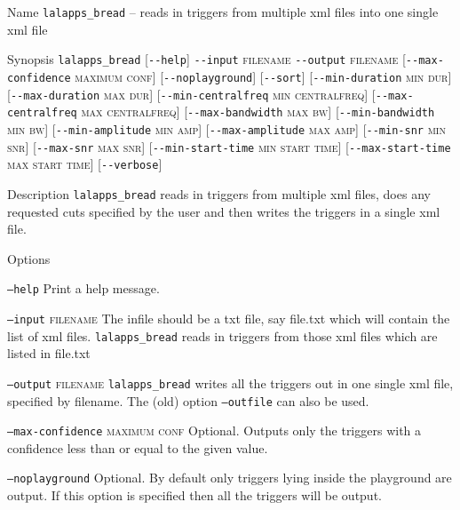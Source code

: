 \begin{entry}
\item[Name]
\verb$lalapps_bread$ -- reads in triggers from multiple xml files into one single xml file 

\item[Synopsis]
\verb$lalapps_bread$ 
[\verb$--help$]
\verb$--input$ \textsc{filename} 
\verb$--output$ \textsc{filename} 
[\verb$--max-confidence$ \textsc{maximum conf}]
[\verb$--noplayground$]
[\verb$--sort$]
[\verb$--min-duration$ \textsc{min dur}]
[\verb$--max-duration$ \textsc{max dur}]
[\verb$--min-centralfreq$ \textsc{min centralfreq}]
[\verb$--max-centralfreq$ \textsc{max centralfreq}]
[\verb$--max-bandwidth$ \textsc{max bw}]
[\verb$--min-bandwidth$ \textsc{min bw}]
[\verb$--min-amplitude$ \textsc{min amp}]
[\verb$--max-amplitude$ \textsc{max amp}]
[\verb$--min-snr$ \textsc{min snr}]
[\verb$--max-snr$ \textsc{max snr}]
[\verb$--min-start-time$ \textsc{min start time}]
[\verb$--max-start-time$ \textsc{max start time}]
[\verb$--verbose$]

\item[Description] 
\verb$lalapps_bread$
reads in triggers from multiple xml files, does any requested cuts
specified by the user and then writes the triggers in a single xml 
file.  

\item[Options]\leavevmode
\begin{entry}
\item[\texttt{--help}] Print a help message.

\item[\texttt{--input} \textsc{filename}]
The infile should be a txt file, say file.txt which
will contain the list of xml files. \verb$lalapps_bread$ reads 
in triggers from those xml files which are listed in file.txt

\item[\texttt{--output} \textsc{filename}]
\verb$lalapps_bread$ writes all the triggers out in one single xml file, specified by filename.  The (old) option \texttt{--outfile} can also be used.

\item[\texttt{--max-confidence} \textsc{maximum conf}]
Optional. Outputs only the triggers with a confidence less than or equal to the given value.

\item[\texttt{--noplayground}]
Optional. By default only triggers lying inside the playground are output. If this option is 
specified then all the triggers will be output. 


\end{entry}
\end{entry}

